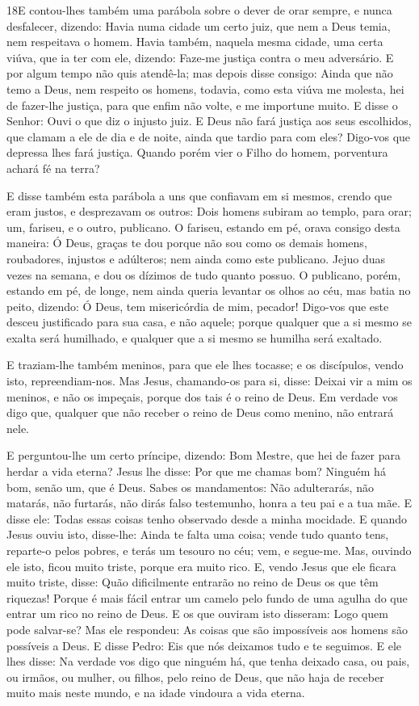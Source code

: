 \medskip

\lettrine{18} E contou-lhes também uma parábola sobre o dever
de orar sempre, e nunca desfalecer, dizendo: Havia numa cidade
um certo juiz, que nem a Deus temia, nem respeitava o homem.
Havia também, naquela mesma cidade, uma certa viúva, que ia ter
com ele, dizendo: Faze-me justiça contra o meu adversário. E por
algum tempo não quis atendê-la; mas depois disse consigo: Ainda que
não temo a Deus, nem respeito os homens, todavia, como esta
viúva me molesta, hei de fazer-lhe justiça, para que enfim não
volte, e me importune muito. E disse o Senhor: Ouvi o que diz o
injusto juiz. E Deus não fará justiça aos seus escolhidos, que
clamam a ele de dia e de noite, ainda que tardio para com eles?
Digo-vos que depressa lhes fará justiça. Quando porém vier o
Filho do homem, porventura achará fé na terra?

E disse também esta parábola a uns que confiavam em si mesmos,
crendo que eram justos, e desprezavam os outros: Dois homens
subiram ao templo, para orar; um, fariseu, e o outro, publicano.
O fariseu, estando em pé, orava consigo desta maneira: Ó
Deus, graças te dou porque não sou como os demais homens,
roubadores, injustos e adúlteros; nem ainda como este publicano.
Jejuo duas vezes na semana, e dou os dízimos de tudo quanto
possuo. O publicano, porém, estando em pé, de longe, nem
ainda queria levantar os olhos ao céu, mas batia no peito, dizendo:
Ó Deus, tem misericórdia de mim, pecador! Digo-vos que este
desceu justificado para sua casa, e não aquele; porque qualquer que
a si mesmo se exalta será humilhado, e qualquer que a si mesmo se
humilha será exaltado.

E traziam-lhe também meninos, para que ele lhes tocasse; e os
discípulos, vendo isto, repreendiam-nos. Mas Jesus,
chamando-os para si, disse: Deixai vir a mim os meninos, e não os
impeçais, porque dos tais é o reino de Deus. Em verdade vos
digo que, qualquer que não receber o reino de Deus como menino, não
entrará nele.

E perguntou-lhe um certo príncipe, dizendo: Bom Mestre, que hei
de fazer para herdar a vida eterna? Jesus lhe disse: Por que
me chamas bom? Ninguém há bom, senão um, que é Deus. Sabes os
mandamentos: Não adulterarás, não matarás, não furtarás, não dirás
falso testemunho, honra a teu pai e a tua mãe. E disse ele:
Todas essas coisas tenho observado desde a minha mocidade. E
quando Jesus ouviu isto, disse-lhe: Ainda te falta uma coisa; vende
tudo quanto tens, reparte-o pelos pobres, e terás um tesouro no céu;
vem, e segue-me. Mas, ouvindo ele isto, ficou muito triste,
porque era muito rico. E, vendo Jesus que ele ficara muito
triste, disse: Quão dificilmente entrarão no reino de Deus os que
têm riquezas! Porque é mais fácil entrar um camelo pelo fundo
de uma agulha do que entrar um rico no reino de Deus. E os
que ouviram isto disseram: Logo quem pode salvar-se? Mas ele
respondeu: As coisas que são impossíveis aos homens são possíveis a
Deus. E disse Pedro: Eis que nós deixamos tudo e te seguimos.
E ele lhes disse: Na verdade vos digo que ninguém há, que
tenha deixado casa, ou pais, ou irmãos, ou mulher, ou filhos, pelo
reino de Deus, que não haja de receber muito mais neste
mundo, e na idade vindoura a vida eterna.

